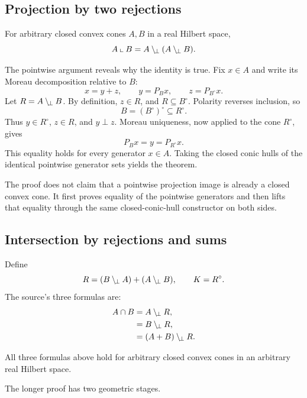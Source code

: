 \documentclass[11pt,a4paper]{article}
\begin{document}
\subsection{Projection by two rejections}

\begin{theorem}
\label{thm:double}
For arbitrary closed convex cones \(A,B\) in a real Hilbert space,
\[
  A\mathbin{\llcorner} B=A\mathbin{\backslash_{\!\perp}}(A\mathbin{\backslash_{\!\perp}} B).
\]
\end{theorem}

The pointwise argument reveals why the identity is true. Fix \(x\in A\) and
write its Moreau decomposition relative to \(B\):
\[
  x=y+z,\qquad y=P_Bx,\qquad z=P_{B^\circ}x.
\]
Let \(R=A\mathbin{\backslash_{\!\perp}} B\). By definition, \(z\in R\), and
\(R\subseteq B^\circ\). Polarity reverses inclusion, so
\[
  B=(B^\circ)^\circ\subseteq R^\circ.
\]
Thus \(y\in R^\circ\), \(z\in R\), and \(y\perp z\). Moreau uniqueness,
now applied to the cone \(R^\circ\), gives
\[
  P_Bx=y=P_{R^\circ}x.
\]
This equality holds for every generator \(x\in A\). Taking the closed conic
hulls of the identical pointwise generator sets yields the theorem.

\begin{keyresult}
The proof does not claim that a pointwise projection image is already a
closed convex cone. It first proves equality of the pointwise generators and
then lifts that equality through the same closed-conic-hull constructor on
both sides.
\end{keyresult}

\subsection{Intersection by rejections and sums}

Define
\[
  R=(B\mathbin{\backslash_{\!\perp}} A)+(A\mathbin{\backslash_{\!\perp}} B),
  \qquad K=R^\circ.
\]
The source's three formulas are:
\[
\begin{aligned}
  A\cap B
    &=A\mathbin{\backslash_{\!\perp}} R,\\
    &=B\mathbin{\backslash_{\!\perp}} R,\\
    &=(A+B)\mathbin{\backslash_{\!\perp}} R.
\end{aligned}
\]

\begin{theorem}
\label{thm:intersection}
All three formulas above hold for arbitrary closed convex cones in an
arbitrary real Hilbert space.
\end{theorem}

The longer proof has two geometric stages.
\end{document}
